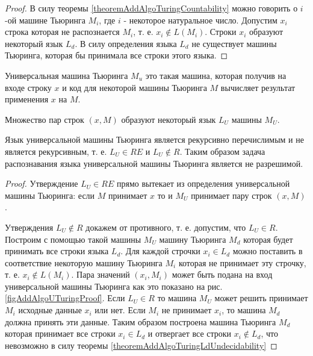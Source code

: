 \begin{proof}
В силу теоремы \ref{theoremAddAlgoTuringCountability} можно говорить о
$i$-ой машине Тьюринга $M_i$, где $i$ - некоторое натуральное
число. Допустим $x_i$ строка которая не распознается $M_i$, т. е. 
$x_i \notin L\left(M_i\right)$. Строки $x_i$ образуют некоторый язык
$L_d$. В силу определения языка $L_d$ не существует машины Тьюринга,
которая бы принимала все строки этого языка.
\end{proof}

\begin{definition}
Универсальная машина Тьюринга $M_u$ это такая машина, которая получив
на входе строку $x$ и код для некоторой машины Тьюринга $M$ вычисляет
результат применения $x$ на $M$.
\end{definition}



Множество пар строк $\left(x, M\right)$ образуют некоторый язык $L_U$ машины
$M_U$. 



\begin{theorem}

Язык универсальной машины Тьюринга является рекурсивно перечислимым и
не является рекурсивным, т. е. $L_U \in RE$ и $L_U \notin R$. Таким
образом задача распознавания языка универсальной машины Тьюринга
является не разрешимой.
\label{theoremAddAlgoTuringUniversalMachine}
\end{theorem}

\begin{proof}
Утверждение $L_U \in RE$ прямо вытекает из определения универсальной
машины Тьюринга: если $M$ принимает $x$ то и $M_U$ принимает пару
строк $\left(x, M\right)$.

Утверждения $L_U \notin R$ докажем от противного, т. е. допустим, что
$L_U \in R$. Построим с помощью такой машины $M_U$ машину Тьюринга
$M_d$ которая будет принимать все строки языка $L_d$. Для каждой строчки
$x_i \in L_d$ можно поставить в соответствие некоторую машину Тьюринга
$M_i$ которая не принимает эту строчку, т. е. $x_i \notin
L\left(M_i\right)$. Пара значений $\left(x_i, M_i\right)$ может быть
подана на вход универсальной машины Тьюринга как это показано на рис. 
\ref{figAddAlgoUTuringProof}. Если $L_U \in R$ то машина $M_U$ может
решить принимает $M_i$ исходные данные $x_i$ или нет. Если $M_i$ не
принимает $x_i$, то машина $M_d$ должна принять эти данные. Таким
образом построена машина Тьюринга $M_d$ которая принимает все строки
$x_i \in L_d$ и отвергает все строки $x_i \notin L_d$, что невозможно
в силу теоремы \ref{theoremAddAlgoTuringLdUndecidability}
\end{proof}

